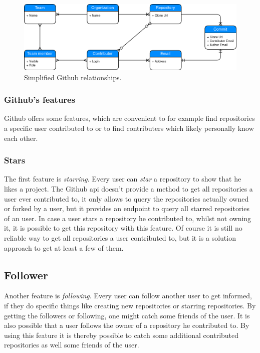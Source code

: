 \begin{figure}[H]
\includegraphics[scale=0.27]{./graphs/github-data-structure}
\centering
\caption{Simplified Github relationships.}\label{fig:github-relationship}
\end{figure}

\subsubsection{Github's features}
Github offers some features, which are convenient to for example find repositories a specific user contributed to or to find contributers which likely personally know each other.

\subsubsection{Stars}
The first feature is \emph{starring}. Every user can \emph{star} a repository to show that he likes a project.
The Github \ac{api} doesn't provide a method to get all repositories a user ever contributed to, it only allows to query the repositories actually owned or forked by a user, but it provides an endpoint to query all starred repositories of an user.
In case a user stars a repository he contributed to, whilst not owning it, it is possible to get this repository with this feature.
Of course it is still no reliable way to get all repositories a user contributed to, but it is a solution approach to get at least a few of them.

\subsection{Follower}
Another feature is \emph{following}. Every user can follow another user to get informed, if they do specific things like creating new repositories or starring repositories.
By getting the followers or following, one might catch some friends of the user.
It is also possible that a user follows the owner of a repository he contributed to.
By using this feature it is thereby possible to catch some additional contributed repositories as well some friends of the user.

